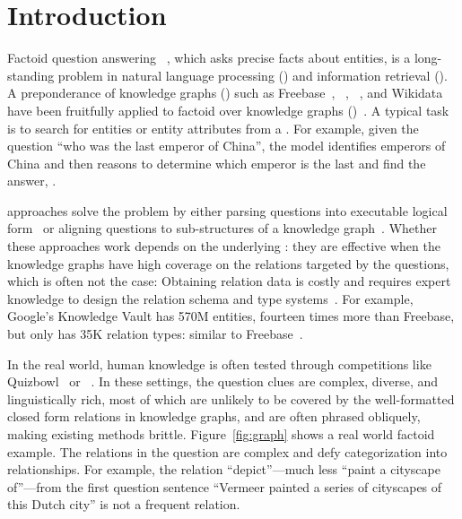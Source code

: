 \section{Introduction}
\label{sec:intro}




Factoid question answering ~\cite[]{wang2006survey,iyyer2014neural, gardner2019question}, which asks precise facts about entities, 
is a long-standing problem in
natural language processing () and information retrieval ().
%
A preponderance of knowledge graphs ()
such as Freebase~\cite{bollacker2008freebase}, \dbpedia{}~\cite{mendes2011dbpedia}, 
~\cite{suchanek2007yago}, and Wikidata~\cite{vrandevcic2014wikidata}
have been fruitfully applied to factoid  over knowledge
graphs ()~\cite[inter alia]{bordes2014question, dong-etal-2015-question}. 
A typical  task is to search for entities or
entity attributes from a .
%
For example, given the question ``who was the last emperor of China'',
the model identifies emperors of China and then reasons to determine
which emperor is the last and find the answer, .




\kgqa{} approaches solve the problem by
either parsing questions into executable logical
form~\cite{cai2013large, kwiatkowski2013scaling} or aligning questions
to sub-structures of a knowledge graph~\cite{yao2014information,
  yih2015semantic}.
%
Whether these approaches work depends on the underlying : they
are effective when the knowledge graphs have high coverage 
on the relations targeted by the questions, which is often not the case:
%
Obtaining relation data is costly and requires expert knowledge 
 to design the relation schema and type
 systems~\cite{Paulheim2018HowMI}.
For example, Google's Knowledge Vault has 570M entities, fourteen times more
than Freebase, but only has 35K relation types: similar to
Freebase~\cite{knowledgevalut, bollacker2008freebase}.


In the real world, human knowledge is often tested through
competitions like Quizbowl~\cite{boyd-graber-12} or
\jeopardy{}~\cite{ferruci-10}.
%
In these settings, the question clues are complex, diverse, and
linguistically rich,
most of which are unlikely to be covered by the well-formatted 
closed form relations in knowledge graphs,
and are often phrased obliquely, 
making existing \kgqa{} methods brittle.
Figure~\ref{fig:graph} shows a real world factoid  example.
%
The relations in the question are complex and defy categorization into
\kg{} relationships.
%
For example, the relation ``depict''---much less ``paint a cityscape of''---from the first
question sentence ``Vermeer painted a series of cityscapes of this
Dutch city'' is not a frequent \kg{} relation.

